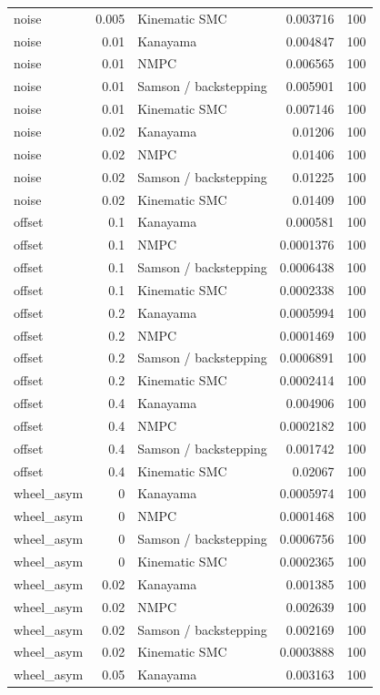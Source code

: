 \begin{table}
{\begin{tabular}{lrlrr}
noise & 0.005 & Kinematic SMC & 0.003716 & 100 \\
noise & 0.01 & Kanayama & 0.004847 & 100 \\
noise & 0.01 & NMPC & 0.006565 & 100 \\
noise & 0.01 & Samson / backstepping & 0.005901 & 100 \\
noise & 0.01 & Kinematic SMC & 0.007146 & 100 \\
noise & 0.02 & Kanayama & 0.01206 & 100 \\
noise & 0.02 & NMPC & 0.01406 & 100 \\
noise & 0.02 & Samson / backstepping & 0.01225 & 100 \\
noise & 0.02 & Kinematic SMC & 0.01409 & 100 \\
offset & 0.1 & Kanayama & 0.000581 & 100 \\
offset & 0.1 & NMPC & 0.0001376 & 100 \\
offset & 0.1 & Samson / backstepping & 0.0006438 & 100 \\
offset & 0.1 & Kinematic SMC & 0.0002338 & 100 \\
offset & 0.2 & Kanayama & 0.0005994 & 100 \\
offset & 0.2 & NMPC & 0.0001469 & 100 \\
offset & 0.2 & Samson / backstepping & 0.0006891 & 100 \\
offset & 0.2 & Kinematic SMC & 0.0002414 & 100 \\
offset & 0.4 & Kanayama & 0.004906 & 100 \\
offset & 0.4 & NMPC & 0.0002182 & 100 \\
offset & 0.4 & Samson / backstepping & 0.001742 & 100 \\
offset & 0.4 & Kinematic SMC & 0.02067 & 100 \\
wheel\_asym & 0 & Kanayama & 0.0005974 & 100 \\
wheel\_asym & 0 & NMPC & 0.0001468 & 100 \\
wheel\_asym & 0 & Samson / backstepping & 0.0006756 & 100 \\
wheel\_asym & 0 & Kinematic SMC & 0.0002365 & 100 \\
wheel\_asym & 0.02 & Kanayama & 0.001385 & 100 \\
wheel\_asym & 0.02 & NMPC & 0.002639 & 100 \\
wheel\_asym & 0.02 & Samson / backstepping & 0.002169 & 100 \\
wheel\_asym & 0.02 & Kinematic SMC & 0.0003888 & 100 \\
wheel\_asym & 0.05 & Kanayama & 0.003163 & 100 \\

\end{tabular}}
\end{table}
